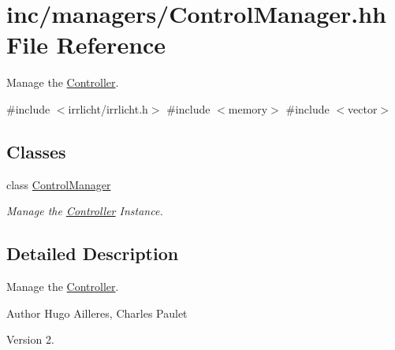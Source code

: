 \hypertarget{ControlManager_8hh}{}\section{inc/managers/\+Control\+Manager.hh File Reference}
\label{ControlManager_8hh}


Manage the \hyperlink{classController}{Controller}.  


{\ttfamily \#include $<$irrlicht/irrlicht.\+h$>$}\newline
{\ttfamily \#include $<$memory$>$}\newline
{\ttfamily \#include $<$vector$>$}\newline
\subsection*{Classes}
\begin{DoxyCompactItemize}
\item 
class \hyperlink{classControlManager}{Control\+Manager}
\begin{DoxyCompactList}\small\item\em Manage the \hyperlink{classController}{Controller} Instance. \end{DoxyCompactList}\end{DoxyCompactItemize}


\subsection{Detailed Description}
Manage the \hyperlink{classController}{Controller}. 

\begin{DoxyAuthor}{Author}
Hugo Ailleres, Charles Paulet 
\end{DoxyAuthor}
\begin{DoxyVersion}{Version}
2. 
\end{DoxyVersion}
